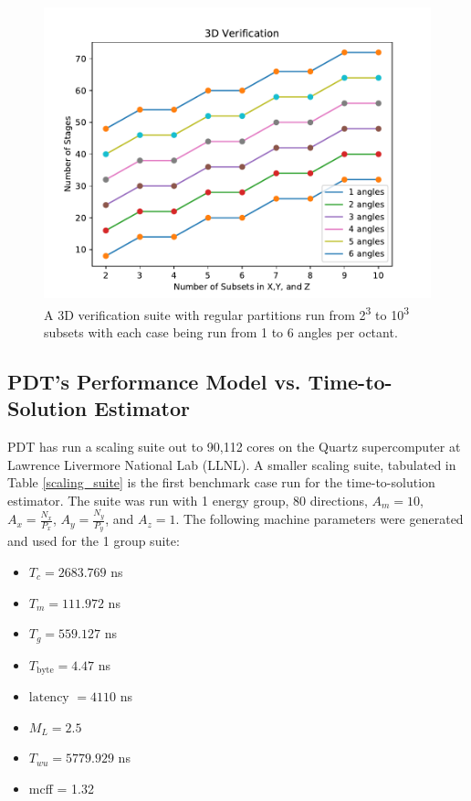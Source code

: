 \documentclass[times,final]{elsarticle}
\begin{document}
\begin{figure}[H]
\centering
\includegraphics[scale=0.8]{../figures/3d_verification.pdf}
\caption{A 3D verification suite with regular partitions run from 2\textsuperscript{3} to 10\textsuperscript{3} subsets with each case being run from 1 to 6 angles per octant.}
\label{3d_verification}
\end{figure}


\subsection{PDT's Performance Model vs. Time-to-Solution Estimator}

PDT has run a scaling suite out to 90,112 cores on the Quartz supercomputer \cite{quartz} at Lawrence Livermore National Lab (LLNL).
A smaller scaling suite, tabulated in Table \ref{scaling_suite} is the first benchmark case run for the time-to-solution estimator.
The suite was run with 1 energy group, 80 directions, $A_m = 10$, $A_x=\frac{N_x}{P_x}$, $A_y=\frac{N_y}{P_y}$, and $A_z = 1$.
The following machine parameters were generated and used for the 1 group suite:
\begin{itemize}
  \item $T_c = 2683.769$ ns
  \item $T_m = 111.972$ ns
  \item $T_g = 559.127$ ns
  \item $T_\text{byte} = 4.47$ ns
  \item $\text{latency }= 4110$ ns
  \item $M_L = 2.5$
  \item $T_{wu} = 5779.929$ ns
  \item mcff = 1.32
\end{itemize}
\end{document}
